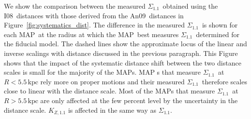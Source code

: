 \documentclass{emulateapj}
\renewcommand{\figurename}{Figure}
\newcommand{\map}{MAP}
\newcommand{\kpc}{\ensuremath{\,\mathrm{kpc}}}
\newcommand{\sigoneone}{\ensuremath{\Sigma_{1.1}}}
\newcommand{\kzoneone}{\ensuremath{K_{Z,1.1}}}
\newcommand{\iv}{I08}
\newcommand{\an}{An09}
\begin{document}
We show the comparison between the measured \sigoneone\ obtained using
the \iv\ distances with those derived from the \an\ distances in
\figurename~\ref{fig:systematics_dist}. The difference in the measured
\sigoneone\ is shown for each \map\ at the radius at which the
\map\ best measures \sigoneone\ determined for the fiducial model. The
dashed lines show the approximate locus of the linear and inverse
scalings with distance discussed in the previous paragraph. This
Figure shows that the impact of the systematic distance shift between
the two distance scales is small for the majority of the \map s. \map
s that measure \sigoneone\ at $R < 5.5\kpc$ rely more on proper
motions and their measured \sigoneone\ therefore scales close to
linear with the distance scale. Most of the \map s that measure
\sigoneone\ at $R > 5.5\kpc$ are only affected at the few percent
level by the uncertainty in the distance scale. $\kzoneone$ is
affected in the same way as \sigoneone.
\end{document}
